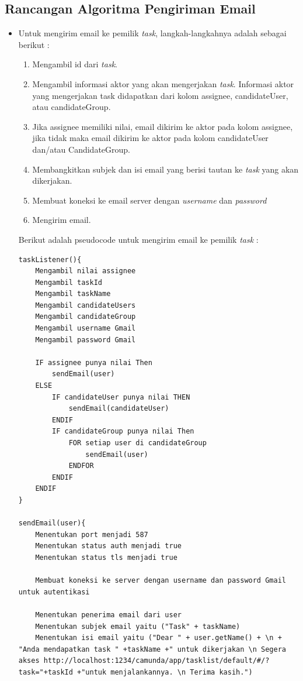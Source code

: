 \subsection{Rancangan Algoritma Pengiriman Email}
\label{sec:Rancangansistem_algoritma}
\begin{itemize}

\item Untuk mengirim email ke pemilik \textit{task}, langkah-langkahnya adalah sebagai berikut :
\begin{enumerate}
	\item Mengambil id dari \textit{task}.
	\item Mengambil informasi aktor yang akan mengerjakan \textit{task}. Informasi aktor yang mengerjakan task didapatkan dari kolom assignee, candidateUser, atau candidateGroup.
	\item Jika assignee memiliki nilai, email dikirim ke aktor pada kolom assignee, jika tidak maka email dikirim ke aktor pada kolom candidateUser dan/atau CandidateGroup. 
	\item Membangkitkan subjek dan isi email yang berisi tautan ke \textit{task} yang akan dikerjakan. 
	\item Membuat koneksi ke email server dengan \textit{username} dan \textit{password}
	\item Mengirim email.
\end{enumerate}

Berikut adalah pseudocode untuk mengirim email ke pemilik \textit{task} :

\begin{lstlisting}[basicstyle=\tiny,caption=Pseudocode TaskAssignmentListener]
taskListener(){
	Mengambil nilai assignee 
	Mengambil taskId
	Mengambil taskName
	Mengambil candidateUsers
	Mengambil candidateGroup
	Mengambil username Gmail
	Mengambil password Gmail
	
	IF assignee punya nilai Then
		sendEmail(user)
	ELSE
		IF candidateUser punya nilai THEN
			sendEmail(candidateUser)
		ENDIF
		IF candidateGroup punya nilai Then
			FOR setiap user di candidateGroup
				sendEmail(user)
			ENDFOR
		ENDIF
	ENDIF
}

sendEmail(user){
	Menentukan port menjadi 587
	Menentukan status auth menjadi true
	Menentukan status tls menjadi true
	
	Membuat koneksi ke server dengan username dan password Gmail untuk autentikasi
	
	Menentukan penerima email dari user
	Menentukan subjek email yaitu ("Task" + taskName)
	Menentukan isi email yaitu ("Dear " + user.getName() + \n + "Anda mendapatkan task " +taskName +" untuk dikerjakan \n Segera akses http://localhost:1234/camunda/app/tasklist/default/#/?task="+taskId +"untuk menjalankannya. \n Terima kasih.")


\end{lstlisting}
\end{itemize}
